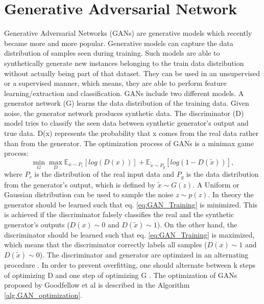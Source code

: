 \section{Generative Adversarial Network}
Generative Adversarial Networks (GANs) are generative models which recently became more and more popular. Generative models can capture the data distribution of samples seen during training. Such models are able to synthetically generate new instances belonging to the train data distribution without actually being part of that dataset. They can be used in an unsupervised or a supervised manner, which means, they are able to perform feature learning/extraction and classification. GANs include two different models. A generator network (G) learns the data distribution of the training data. Given noise, the generator network produces synthetic data. The discriminator (D) model tries to classify the seen data between synthetic generator's output and true data. D(x) represents the probability that x comes from the real data rather than from the generator. The optimization process of GANs is a minimax game process:
\begin{equation}
    \min_{G} \max_{D} \mathbb{E}_{x \sim P_{r}} [log(D(x))] + \mathbb{E}_{\tilde{x} \sim P_{g}}[log(1-D(\tilde{x}))],
    \label{eq:GAN_Training}
\end{equation}
where $P_{r}$ is the distribution of the real input data and $P_{g}$ is the data distribution from the generator's output, which is defined by  $\tilde{x}  \sim G(z)$. A Uniform or Gaussian distribution can be used to sample the noise $z \sim p(z)$. In theory the generator should be learned such that eq. \ref{eq:GAN_Training} is minimized. This is achieved if the discriminator falsely classifies the real and the synthetic generator's outputs ($D(x) \sim 0$ and $D(\tilde{x}) \sim 1$). On the other hand, the discriminator should be learned such that eq. \ref{eq:GAN_Training} is maximized, which means that the discriminator correctly labels all samples ($D(x) \sim 1$ and $D(\tilde{x}) \sim 0$). The discriminator and generator are optimized in an alternating procedure \cite{Goodfellow2014}. In order to prevent overfitting, one should alternate between k steps of optimizing D and one step of optimizing G \cite{Goodfellow2014}. The optimization of GANs proposed by Goodfellow et al \cite{Goodfellow2014} is described in the Algorithm \ref{alg.GAN_optimization}.


